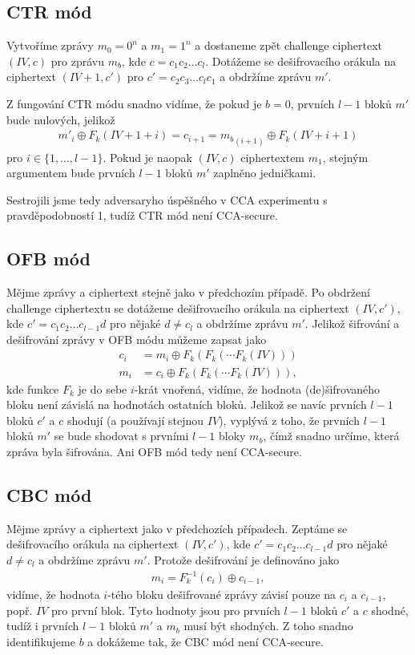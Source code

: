 \documentclass{scrartcl}
\DeclareMathOperator{\xor}{\oplus}
\begin{document}
    \subsection*{CTR mód}
    Vytvoříme zprávy $m_0 = 0^n$ a $m_1 = 1^n$ a dostaneme zpět challenge ciphertext $(IV,c)$ pro zprávu $m_b$, kde $c=c_1c_2\dots c_l$. Dotážeme se dešifrovacího orákula na ciphertext $(IV+1,c')$ pro $c'=c_2c_3\dots c_lc_1$ a obdržíme zprávu $m'$.

    Z fungování CTR módu snadno vidíme, že pokud je $b = 0$, prvních $l-1$ bloků $m'$ bude nulových, jelikož
    \begin{align*}
        m'_i \xor F_k(IV+1+i) = c_{i+1} = {m_b}_{(i+1)} \xor F_k(IV+i+1)
    \end{align*}
    pro $i \in \{1,\dots,l-1\}$. Pokud je naopak $(IV,c)$ ciphertextem $m_1$, stejným argumentem bude prvních $l-1$ bloků $m'$ zaplněno jedničkami.

    Sestrojili jsme tedy adversaryho úspěšného v CCA experimentu s pravděpodobností 1, tudíž CTR mód není CCA-secure.

    \subsection*{OFB mód}
    Mějme zprávy a ciphertext stejně jako v předchozím případě. Po obdržení challenge ciphertextu se dotážeme dešifrovacího orákula na ciphertext $(IV,c')$, kde $c' = c_1c_2\dots c_{l-1}d$ pro nějaké $d \neq c_l$ a obdržíme zprávu $m'$. Jelikož šifrování a dešifrování zprávy v OFB módu můžeme zapsat jako
    \begin{align*}
        c_i &= m_i \xor F_k(F_k(\cdots F_k(IV))) \\
        m_i &= c_i \xor F_k(F_k(\cdots F_k(IV))),
    \end{align*}
    kde funkce $F_k$ je do sebe $i$-krát vnořená, vidíme, že hodnota (de)šifrovaného bloku není závislá na hodnotách ostatních bloků. Jelikož se navíc prvních $l-1$ bloků $c'$ a $c$ shodují (a používají stejnou $IV$), vyplývá z toho, že prvních $l-1$ bloků $m'$ se bude shodovat s prvními $l-1$ bloky $m_b$, čímž snadno určíme, která zpráva byla šifrována. Ani OFB mód tedy není CCA-secure.

    \subsection*{CBC mód}
    Mějme zprávy a ciphertext jako v předchozích případech. Zeptáme se dešifrovacího orákula na ciphertext $(IV,c')$, kde $c' = c_1c_2\dots c_{l-1}d$ pro nějaké $d \neq c_l$ a obdržíme zprávu $m'$. Protože dešifrování je definováno jako
    \begin{align*}
        m_i = F_k^{-1}(c_i) \xor c_{i-1},
    \end{align*}
    vidíme, že hodnota $i$-tého bloku dešifrované zprávy závisí pouze na $c_i$ a $c_{i-1}$, popř. $IV$ pro první blok. Tyto hodnoty jsou pro prvních $l-1$ bloků $c'$ a $c$ shodné, tudíž i prvních $l-1$ bloků $m'$ a $m_b$ musí být shodných. Z toho snadno identifikujeme $b$ a dokážeme tak, že CBC mód není CCA-secure.
\end{document}
